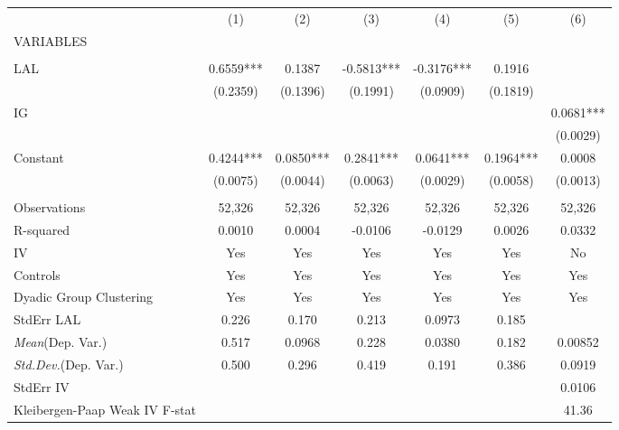 \documentclass[]{article}
\begin{document}
\begin{tabular}{lcccccc} \hline
 & (1) & (2) & (3) & (4) & (5) & (6) \\
VARIABLES &  &  &  &  &  &  \\ \hline
 &  &  &  &  &  &  \\
LAL & 0.6559*** & 0.1387 & -0.5813*** & -0.3176*** & 0.1916 &  \\
 & (0.2359) & (0.1396) & (0.1991) & (0.0909) & (0.1819) &  \\
IG &  &  &  &  &  & 0.0681*** \\
 &  &  &  &  &  & (0.0029) \\
Constant & 0.4244*** & 0.0850*** & 0.2841*** & 0.0641*** & 0.1964*** & 0.0008 \\
 & (0.0075) & (0.0044) & (0.0063) & (0.0029) & (0.0058) & (0.0013) \\
 &  &  &  &  &  &  \\
Observations & 52,326 & 52,326 & 52,326 & 52,326 & 52,326 & 52,326 \\
R-squared & 0.0010 & 0.0004 & -0.0106 & -0.0129 & 0.0026 & 0.0332 \\
IV & Yes & Yes & Yes & Yes & Yes & No \\
Controls & Yes & Yes & Yes & Yes & Yes & Yes \\
Dyadic Group Clustering & Yes & Yes & Yes & Yes & Yes & Yes \\
StdErr LAL & 0.226 & 0.170 & 0.213 & 0.0973 & 0.185 &  \\
\textit{Mean}(Dep. Var.) & 0.517 & 0.0968 & 0.228 & 0.0380 & 0.182 & 0.00852 \\
\textit{Std.Dev.}(Dep. Var.) & 0.500 & 0.296 & 0.419 & 0.191 & 0.386 & 0.0919 \\
StdErr IV &  &  &  &  &  & 0.0106 \\
 Kleibergen-Paap Weak IV F-stat &  &  &  &  &  & 41.36 \\ \hline
\end{tabular}
\end{document}
